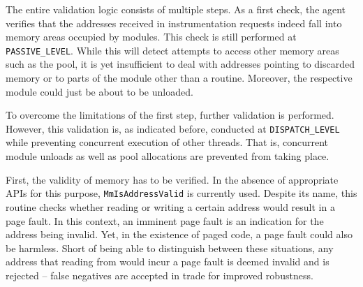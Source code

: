 The entire validation logic consists of multiple steps. As a first check, the agent 
verifies that the addresses received in instrumentation requests indeed fall into 
memory areas occupied by modules. This check is still performed at \verb|PASSIVE_LEVEL|.
While this will detect attempts to access other 
memory areas such as the pool, it is yet insufficient to deal with addresses pointing 
to discarded memory or to parts of the module other than a routine. Moreover, the 
respective module could just be about to be unloaded.





To overcome the limitations of the first step, further validation is performed. 
However, this validation is, as indicated
before, conducted at \verb|DISPATCH_LEVEL| while preventing concurrent execution 
of other threads. That is, concurrent module unloads as well as pool allocations
are prevented from taking place.

First, the validity of memory has to be verified. In the absence of appropriate APIs 
for this purpose, \verb|MmIsAddressValid| is currently used. Despite its
name, this routine checks whether reading or writing a certain address would result in 
a page fault. In this context, an imminent page fault is an indication for the address
being invalid. Yet, in the existence of paged code, a page fault could also be harmless.
Short of being able to distinguish between these situations, any address that reading
from would incur a page fault is deemed invalid and is rejected -- false negatives
are accepted in trade for improved robustness.

